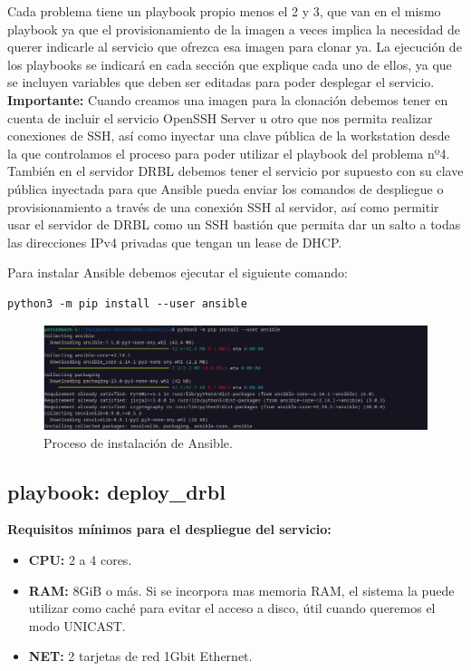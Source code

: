 Cada problema tiene un playbook propio menos el 2 y 3, que van en el mismo playbook ya que el provisionamiento de la imagen a veces implica la necesidad de 
querer indicarle al servicio que ofrezca esa imagen para clonar ya.
\vspace{5mm}
La ejecución de los playbooks se indicará en cada sección que explique cada uno de ellos, ya que se incluyen variables que deben ser editadas para poder desplegar el servicio.
\vspace{5mm}
\textbf{Importante:} Cuando creamos una imagen para la clonación debemos tener en cuenta de incluir el servicio OpenSSH Server u otro que nos permita realizar conexiones de SSH, así
como inyectar una clave pública de la workstation desde la que controlamos el proceso para poder utilizar el playbook del problema nº4. También en el servidor DRBL debemos tener
el servicio por supuesto con su clave pública inyectada para que Ansible pueda enviar los comandos de despliegue o provisionamiento a través de una conexión SSH al servidor, así como
permitir usar el servidor de DRBL como un SSH bastión que permita dar un salto a todas las direcciones IPv4 privadas que tengan un lease de DHCP.


Para instalar Ansible debemos ejecutar el siguiente comando:

\begin{lstlisting}[style=mybash]
python3 -m pip install --user ansible
\end{lstlisting}

\begin{figure}[H]
	\centering
	\includegraphics[scale=0.30]{ansible/install-ansible}
	\caption{Proceso de instalación de Ansible.}
\end{figure}

\newpage
\subsection{playbook: deploy\_drbl}

\textbf{Requisitos mínimos para el despliegue del servicio:}
\begin{itemize}
	\item \textbf{CPU:} 2 a 4 cores.
	\item \textbf{RAM:} 8GiB o más. Si se incorpora mas memoria RAM, el sistema la puede utilizar como caché para evitar el acceso a disco, útil cuando queremos el modo UNICAST.
	\item \textbf{NET:} 2 tarjetas de red 1Gbit Ethernet.
\end{itemize}

